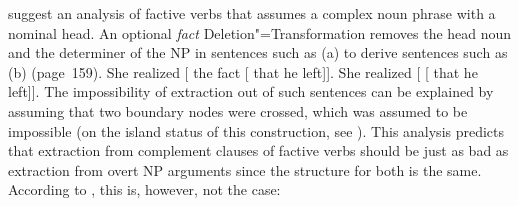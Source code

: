 \noindent
\citet{KK70a} suggest an analysis of factive verbs that assumes a complex noun phrase with a nominal head. An optional
\emph{fact} Deletion"=Transformation removes the head noun and the determiner of the
NP in sentences such as (a) to derive sentences such as (b) (page~159). 
\eal
\ex She realized [ the fact [ that he left]].
\ex She realized [ [ that he left]].
\zl
The impossibility of extraction out of such sentences can be explained by assuming that two boundary
nodes were crossed, which was assumed to be impossible (on
the island status of this construction, see \citealp[Section~4]{KK70a}). This analysis predicts that
extraction from complement clauses of factive verbs should be just as bad as extraction from overt
NP arguments since the structure for both is the same.
According to \citet[]{AG2008a}, this is, however, not the case: 
\eal
{}
\zl

